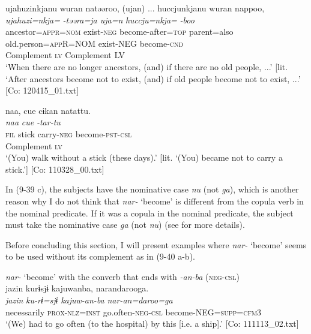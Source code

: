 \ex \label{ex:9.39c} %
    \gllll  ujahuzinkjanu  wuran  natəəroo,  (ujan)  ...  huccjunkjanu  wuran  nappoo,\\
      \textit{ujahuzi=nkja=}  \textit{}  \textit{-təəra=ja  uja=n} \textit{huccju=nkja=}  \textit{}  \textit{-boo}\\
      ancestor=\textsc{appr}=\textsc{nom}  exist-\textsc{neg}  become-after=\textsc{top}  parent=also  old.person=\textsc{app}R=NOM  exist-NEG  become-\textsc{cnd}\\
        Complement  \textsc{lv}                                              Complement  LV\\
      \glt       ‘When there are no longer ancestors, (and) if there are no old people, ...’ [lit. ‘After ancestors become not to exist, (and) if old people become not to exist, ...’ [Co: 120415\_01.txt]

\ex \label{ex:9.39d} %
    \gllll  naa,  {\textbar}cue{\textbar}  cɨkan  natattu.\\
      \textit{naa}  \textit{cue}  \textit{}  \textit{-tar-tu}\\
      \textsc{fil}  stick  carry-\textsc{neg}  become-\textsc{pst}-\textsc{csl}\\
          Complement  \textsc{lv}\\
      \glt       ‘(You) walk without a stick (these days).’ [lit. ‘(You) became not to carry a stick.’] [Co: 110328\_00.txt]
    \z
\z

In (9-39 c), the subjects have the nominative case \textit{nu} (not \textit{ga}), which is another reason why I do not think that \textit{nar-} ‘become’ is different from the copula verb in the nominal predicate. If it was a copula in the nominal predicate, the subject must take the nominative case \textit{ga} (not \textit{nu}) (see  for more details).

Before concluding this section, I will present examples where \textit{nar-} ‘become’ seems to be used without its complement as in (9-40 a-b).

\ea \label{ex:9.40}

\ea \textit{nar-} ‘become’ with the converb that ends with \textit{{}-an-ba} (\textsc{neg}-\textsc{csl})\\
 \glll  jazin  kurɨsjɨ  kajuwanba,  narandarooga.\\
    \textit{jazin}  \textit{ku-rɨ=sjɨ}  \textit{kajuw-an-ba}  \textit{nar-an=daroo=ga}\\
    necessarily  \textsc{prox}-\textsc{nlz}=\textsc{inst}  go.often-\textsc{neg}-\textsc{csl}  become-NEG=\textsc{supp}=\textsc{cfm}3\\
    \glt     ‘(We) had to go often (to the hospital) by this [i.e. a ship].’ [Co: 111113\_02.txt]

